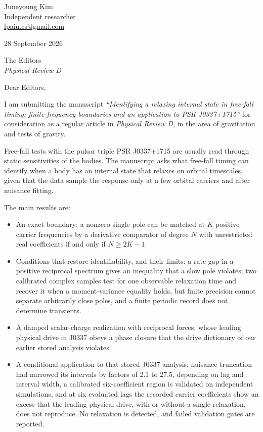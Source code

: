 \documentclass[11pt]{article}
\begin{document}
Juneyoung Kim\\
Independent researcher\\
\href{mailto:lpaiu.cs@gmail.com}{lpaiu.cs@gmail.com}

28 September 2026

The Editors\\
\emph{Physical Review D}

Dear Editors,

I am submitting the manuscript \emph{``Identifying a relaxing internal state in free-fall timing: finite-frequency boundaries and an application to PSR J0337+1715''} for consideration as a regular article in \emph{Physical Review D}, in the area of gravitation and tests of gravity.

Free-fall tests with the pulsar triple PSR J0337+1715 are usually read through static sensitivities of the bodies. The manuscript asks what free-fall timing can identify when a body has an internal state that relaxes on orbital timescales, given that the data sample the response only at a few orbital carriers and after nuisance fitting.

The main results are:
\begin{itemize}\setlength{\itemsep}{1pt}\setlength{\parskip}{0pt}
\item An exact boundary: a nonzero single pole can be matched at $K$ positive carrier frequencies by a derivative comparator of degree $N$ with unrestricted real coefficients if and only if $N\ge2K-1$.
\item Conditions that restore identifiability, and their limits: a rate gap in a positive reciprocal spectrum gives an inequality that a slow pole violates; two calibrated complex samples test for one observable relaxation time and recover it when a moment-variance equality holds, but finite precision cannot separate arbitrarily close poles, and a finite periodic record does not determine transients.
\item A damped scalar-charge realization with reciprocal forces, whose leading physical drive in J0337 obeys a phase closure that the drive dictionary of our earlier stored analysis violates.
\item A conditional application to that stored J0337 analysis: nuisance truncation had narrowed its intervals by factors of 2.1 to 27.5, depending on lag and interval width, a calibrated six-coefficient region is validated on independent simulations, and at six evaluated lags the recorded carrier coefficients show an excess that the leading physical drive, with or without a single relaxation, does not reproduce. No relaxation is detected, and failed validation gates are reported.
\end{itemize}
\end{document}
